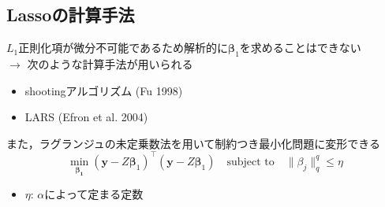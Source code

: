 \documentclass[dvipdfmx, 10pt]{beamer}
\begin{document}
\subsection{Lassoの計算手法}
\begin{frame}{\insertsubsection}
    $L_1$正則化項が微分不可能であるため解析的に$\bm{\beta}_1$を求めることはできない\\
    $\rightarrow$ 次のような計算手法が用いられる
    \begin{itemize}
	\item shootingアルゴリズム (Fu 1998)
	\item LARS (Efron et al. 2004)
    \end{itemize}
	\vspace{10pt}
	また，ラグランジュの未定乗数法を用いて制約つき最小化問題に変形できる
	\begin{equation}
            	\min_{\bm{\beta_1}} (
            		 \bm{y} - Z \bm{\beta}_1 
            	)^{\top}(
            		 \bm{y} - Z \bm{\beta}_1
            	) \quad
            	\text{subject to} \quad \|\beta_j\|_q^q \leq \eta
	\end{equation}
	\begin{itemize}
            	\item $\eta$: $\alpha$によって定まる定数
        \end{itemize}
\end{frame}
\end{document}
